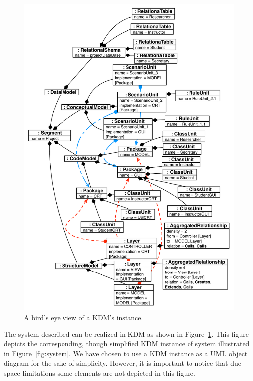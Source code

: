 \begin{figure}
	\centering
	\includegraphics[scale=0.52]{figuras/TreeNewJoint}
	\caption{A bird's eye view of a KDM's instance.}
	\label{fig:allKDMLayers}
\end{figure}

The system described can be realized in KDM as shown in Figure~\ref{fig:allKDMLayers}. This figure depicts the corresponding, though simplified KDM instance of system illustrated in Figure~\ref{fig:system}. We have chosen to use a KDM instance as a UML object diagram for the sake of simplicity. However, it is important to notice that due space limitations some elements are not depicted in this figure.


